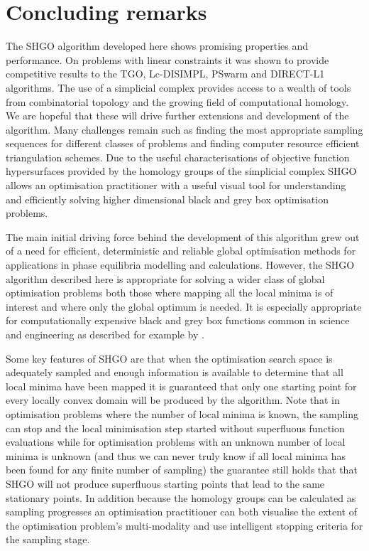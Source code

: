 \section{Concluding remarks}
The SHGO algorithm developed here shows promising properties and performance. On problems with linear constraints it was shown to provide competitive results to the TGO, Lc-DISIMPL, PSwarm and DIRECT-L1 algorithms. The use of a simplicial complex provides access to a wealth of tools from combinatorial topology and the growing field of computational homology. We are hopeful that these will drive further extensions and development of the algorithm. Many challenges remain such as finding the most appropriate sampling sequences for different classes of problems and finding computer resource efficient triangulation schemes. Due to the useful characterisations of objective function hypersurfaces provided by the homology groups of the simplicial complex SHGO allows an optimisation practitioner with a useful visual tool for understanding and efficiently solving higher dimensional black and grey box optimisation problems.

The main initial driving force behind the development of this algorithm grew out of a need for efficient, deterministic and reliable global optimisation methods for applications in phase equilibria modelling and calculations. However, the SHGO algorithm described here is appropriate for solving a wider class of global optimisation problems both those where mapping all the local minima is of interest and where only the global optimum is needed. It is especially appropriate for computationally expensive black and grey box functions common in science and engineering as described for example by \citet{Shan2010}.
 
Some key features of SHGO are that when the optimisation search space is adequately sampled and enough information is available to determine that all local minima have been mapped it is guaranteed that only one starting point for every locally convex domain will be produced by the algorithm. Note that in optimisation problems where the number of local minima is known, the sampling can stop and the local minimisation step started without superfluous function evaluations while for optimisation problems with an unknown number of local minima is unknown (and thus we can never truly know if all local minima has been found for any finite number of sampling) the guarantee still holds that that SHGO will not produce superfluous starting points that lead to the same stationary points. In addition because the homology groups can be calculated as sampling progresses an optimisation practitioner can both visualise the extent of the optimisation problem's multi-modality and use intelligent stopping criteria for the sampling stage.


